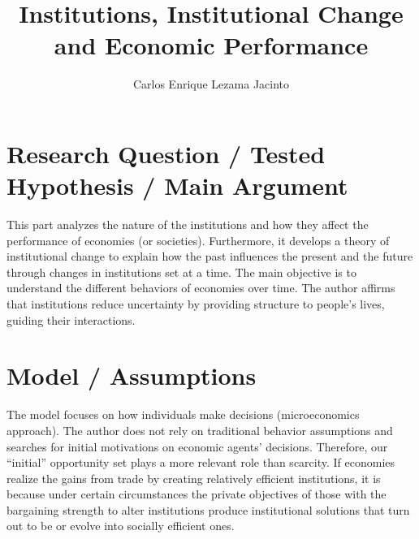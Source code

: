 \documentclass[9pt,twocolumn,twoside,]{pnas-new}
\title{Institutions, Institutional Change and Economic Performance}
\author[]{Carlos Enrique Lezama Jacinto}
\affil[]{Instituto Tecnológico Autónomo de México}
\begin{document}
\verticaladjustment{-2pt}



\maketitle
\thispagestyle{firststyle}


\acknow{}

\hypertarget{research-question-tested-hypothesis-main-argument}{%
\section*{Research Question / Tested Hypothesis / Main
Argument}\label{research-question-tested-hypothesis-main-argument}}

This part analyzes the nature of the institutions and how they affect
the performance of economies (or societies). Furthermore, it develops a
theory of institutional change to explain how the past influences the
present and the future through changes in institutions set at a time.
The main objective is to understand the different behaviors of economies
over time. The author affirms that institutions reduce uncertainty by
providing structure to people's lives, guiding their interactions.

\hypertarget{model-assumptions}{%
\section*{Model / Assumptions}\label{model-assumptions}}

The model focuses on how individuals make decisions (microeconomics
approach). The author does not rely on traditional behavior assumptions
and searches for initial motivations on economic agents' decisions.
Therefore, our ``initial'' opportunity set plays a more relevant role
than scarcity. If economies realize the gains from trade by creating
relatively efficient institutions, it is because under certain
circumstances the private objectives of those with the bargaining
strength to alter institutions produce institutional solutions that turn
out to be or evolve into socially efficient ones.
\end{document}
